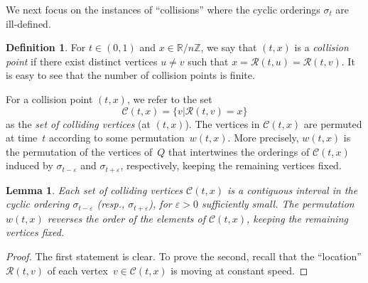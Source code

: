 \documentclass[11pt, letterpaper]{amsart}
\newtheorem{lemma}[theorem]{Lemma}
\theoremstyle{definition}
\newtheorem{definition}[theorem]{Definition}
\numberwithin{equation}{section}
\def\ZZ{{\mathbb Z}}
\def\RR{{\mathbb R}}
\def\O{{\mathcal{O}}}
\begin{document}
We next focus on the instances of ``collisions'' where the cyclic orderings $\sigma_t$ are ill-defined. 

\begin{definition}
\label{def:collisions}
For $t \in (0,1)$ and $x \in \RR/n \ZZ$, we say that $(t,x)$ is a \emph{collision point} 
if there exist distinct vertices $u \neq v$ such that $x=\mathcal{R}(t,u) = \mathcal{R}(t,v)$. 
It is easy to see that the number of collision points is finite. 

For a collision point $(t,x)$, we refer to the set 
\begin{equation*}
\mathcal{C}(t,x) = \{v | \mathcal{R}(t,v) = x\}
\end{equation*}
as the \emph{set of colliding vertices} (at $(t,x)$). %
The vertices in $\mathcal{C}(t,x)$ are permuted at time~$t$ according to some permutation~$w(t,x)$.
More precisely, $w(t,x)$ is the permutation of the vertices of~$Q$
that intertwines the orderings of $\mathcal{C}(t,x)$ 
induced by $\sigma_{t-\varepsilon}$ and $\sigma_{t+\varepsilon}$, 
respectively, keeping the remaining vertices fixed. 
\end{definition}

\begin{lemma}
\label{lem:colliding set contiguous}
Each set of colliding vertices $\mathcal{C}(t, x)$ is a contiguous interval 
in the cyclic ordering $\sigma_{t-\varepsilon}$
(resp., $\sigma_{t+\varepsilon}$), for $\varepsilon > 0$ sufficiently small.
The permutation $w(t,x)$ reverses the order of the elements of $\mathcal{C}(t,x)$,
keeping the remaining vertices fixed. 
\end{lemma}

\begin{proof}
The first statement is clear. 
To prove the second, recall that 
the ``location'' $\mathcal{R}(t,v)$ of each vertex~$v\in\mathcal{C}(t,x)$ is moving at constant speed. 
\end{proof}
\end{document}
